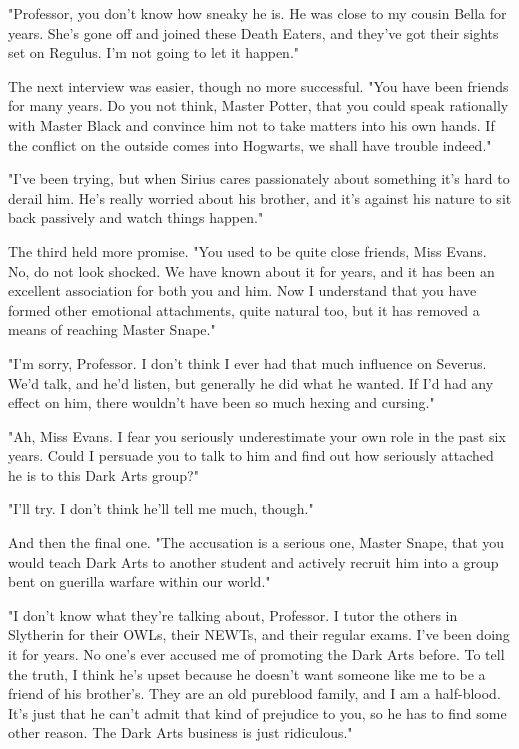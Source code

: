 "Professor, you don't know how sneaky he is. He was close to my cousin Bella for years. She's gone off and joined these Death Eaters, and they've got their sights set on Regulus. I'm not going to let it happen."

The next interview was easier, though no more successful. "You have been friends for many years. Do you not think, Master Potter, that you could speak rationally with Master Black and convince him not to take matters into his own hands. If the conflict on the outside comes into Hogwarts, we shall have trouble indeed."

"I've been trying, but when Sirius cares passionately about something it's hard to derail him. He's really worried about his brother, and it's against his nature to sit back passively and watch things happen."

The third held more promise. "You used to be quite close friends, Miss Evans. No, do not look shocked. We have known about it for years, and it has been an excellent association for both you and him. Now I understand that you have formed other emotional attachments, quite natural too, but it has removed a means of reaching Master Snape."

"I'm sorry, Professor. I don't think I ever had that much influence on Severus. We'd talk, and he'd listen, but generally he did what he wanted. If I'd had any effect on him, there wouldn't have been so much hexing and cursing."

"Ah, Miss Evans. I fear you seriously underestimate your own role in the past six years. Could I persuade you to talk to him and find out how seriously attached he is to this Dark Arts group?"

"I'll try. I don't think he'll tell me much, though."

And then the final one. "The accusation is a serious one, Master Snape, that you would teach Dark Arts to another student and actively recruit him into a group bent on guerilla warfare within our world."

"I don't know what they're talking about, Professor. I tutor the others in Slytherin for their OWLs, their NEWTs, and their regular exams. I've been doing it for years. No one's ever accused me of promoting the Dark Arts before. To tell the truth, I think he's upset because he doesn't want someone like me to be a friend of his brother's. They are an old pureblood family, and I am a half-blood. It's just that he can't admit that kind of prejudice to you, so he has to find some other reason. The Dark Arts business is just ridiculous."

